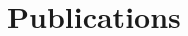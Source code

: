 \chapter*{Publications}


\begin{refsection}[ownpubs]
    \small
    \nocite{*} %
    \begin{spacing}{1.125}
        \printbibliography[heading=none]
    \end{spacing}
\end{refsection}

